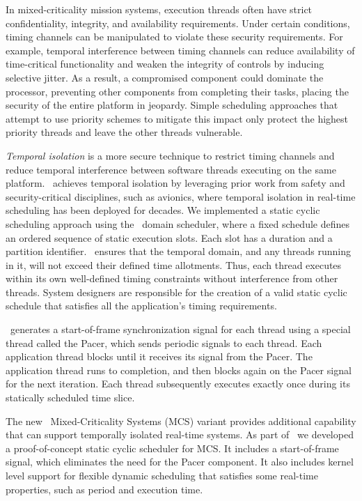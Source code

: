 
In mixed-criticality mission systems,
execution threads often 
have strict confidentiality, integrity, and availability requirements. 
Under certain conditions,
timing channels can be manipulated to violate these security requirements. 
For example, temporal interference between timing channels
can reduce availability of time-critical functionality 
and weaken the integrity of controls by inducing selective jitter.
As a result, a compromised component could dominate the processor, 
preventing other components from completing their tasks, placing the security 
of the entire platform in jeopardy. 
Simple scheduling approaches that attempt to use priority schemes to mitigate 
this impact only protect the highest priority threads and leave the other
threads vulnerable.

\emph{Temporal isolation} is a more secure technique to restrict timing channels and
reduce temporal interference between software threads executing on the same platform. 
\briefcase\ achieves temporal isolation by leveraging
prior work from safety and security-critical disciplines, such as
avionics, where temporal isolation in real-time scheduling has been
deployed for decades.
We implemented a static cyclic scheduling
approach using the \selFour\ domain scheduler, where a fixed schedule
defines an ordered sequence of static execution slots. Each slot has a
duration and a partition identifier.  \selFour\ ensures that the
temporal domain, and any threads running in it, will not exceed their defined
time allotments. Thus, each thread executes within its own
well-defined timing constraints without interference from other threads.
System designers are responsible for the
creation of a valid static cyclic schedule that
satisfies all the application's timing requirements.

\briefcase\ generates a start-of-frame synchronization signal for each thread using
a special thread called the Pacer, which sends periodic signals
to each thread. Each application thread blocks until it receives its
signal from the Pacer. The application thread runs to completion, and then
blocks again on the Pacer signal for the next iteration. 
Each thread subsequently executes
exactly once during its statically scheduled time slice.

The new \selFour\ Mixed-Criticality Systems (MCS) variant provides
additional capability that can support temporally isolated
real-time systems. 
As part of \briefcase\ we developed a proof-of-concept static cyclic
scheduler for MCS.
It includes a start-of-frame signal, which
eliminates the need for the Pacer component. It also includes kernel
level support for flexible dynamic scheduling that satisfies some
real-time properties, such as period and execution time.

